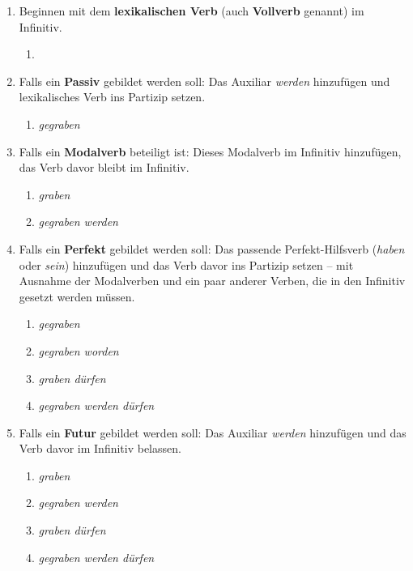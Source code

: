 \begin{enumerate}
  \item Beginnen mit dem \textbf{lexikalischen Verb} (auch \textbf{Vollverb} genannt) im Infinitiv.
    \begin{enumerate}
      \item \textit{}
    \end{enumerate} 
  \item Falls ein \textbf{Passiv} gebildet werden soll: Das Auxiliar \textit{werden} hinzufügen und lexikalisches Verb ins Partizip setzen.
    \begin{enumerate}
      \item \textit{gegraben }
    \end{enumerate}
  \item Falls ein \textbf{Modalverb} beteiligt ist: Dieses Modalverb im Infinitiv hinzufügen, das Verb davor bleibt im Infinitiv.
    \begin{enumerate}
      \item \textit{graben }
      \item \textit{gegraben werden }
    \end{enumerate} 
  \item Falls ein \textbf{Perfekt} gebildet werden soll: Das passende Perfekt-Hilfsverb (\textit{haben} oder \textit{sein}) hinzufügen und das Verb davor ins Partizip setzen -- mit Ausnahme der Modalverben und ein paar anderer Verben, die in den Infinitiv gesetzt werden müssen.
    \begin{enumerate}
      \item \textit{gegraben }
      \item \textit{gegraben worden }
      \item \textit{graben dürfen }
      \item \textit{gegraben werden dürfen }
    \end{enumerate} 
  \item Falls ein \textbf{Futur} gebildet werden soll: Das Auxiliar \textit{werden} hinzufügen und das Verb davor im Infinitiv belassen.
    \begin{enumerate}
      \item \textit{graben }
      \item \textit{gegraben werden }
      \item \textit{graben dürfen }
      \item \textit{gegraben werden dürfen }

\end{enumerate}
\end{enumerate}
